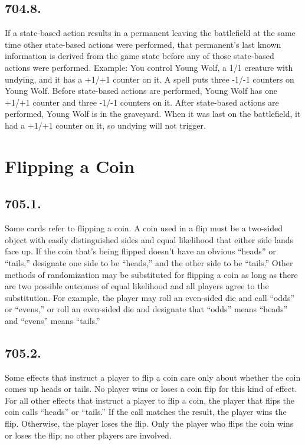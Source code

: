 \subsection*{704.8.}
If a state-based action results in a permanent leaving the battlefield at the same time other state-based actions were performed, that permanent’s last known information is derived from the game state before any of those state-based actions were performed.
Example: You control Young Wolf, a 1/1 creature with undying, and it has a +1/+1 counter on it. A spell puts three -1/-1 counters on Young Wolf. Before state-based actions are performed, Young Wolf has one +1/+1 counter and three -1/-1 counters on it. After state-based actions are performed, Young Wolf is in the graveyard. When it was last on the battlefield, it had a +1/+1 counter on it, so undying will not trigger.

\section{Flipping a Coin}
\subsection*{705.1.}
Some cards refer to flipping a coin. A coin used in a flip must be a two-sided object with easily distinguished sides and equal likelihood that either side lands face up. If the coin that’s being flipped doesn’t have an obvious “heads” or “tails,” designate one side to be “heads,” and the other side to be “tails.” Other methods of randomization may be substituted for flipping a coin as long as there are two possible outcomes of equal likelihood and all players agree to the substitution. For example, the player may roll an even-sided die and call “odds” or “evens,” or roll an even-sided die and designate that “odds” means “heads” and “evens” means “tails.”

\subsection*{705.2.}
Some effects that instruct a player to flip a coin care only about whether the coin comes up heads or tails. No player wins or loses a coin flip for this kind of effect. For all other effects that instruct a player to flip a coin, the player that flips the coin calls “heads” or “tails.” If the call matches the result, the player wins the flip. Otherwise, the player loses the flip. Only the player who flips the coin wins or loses the flip; no other players are involved.

